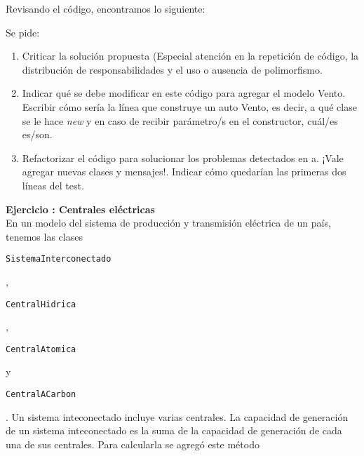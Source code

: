 \documentclass[a4paper,12pt]{article}
\newcounter{ej}
\newcounter{prte}
\newcommand{\ejercicio}[1]{\stepcounter{ej} \setcounter{prte}{0} \par \textbf{ Ejercicio \arabic{ej}: #1} \\ }
\newcommand{\code}[1]{\begin{small}\texttt{#1}\end{small}}
\begin{document}
Revisando el código, encontramos lo siguiente:


Se pide:
\begin{enumerate}
	\item Criticar la solución propuesta (Especial atención en la repetición de código, la distribución de responsabilidades y el uso o ausencia de polimorfismo. 
	\item Indicar qué se debe modificar en este código para agregar el modelo Vento. 			Escribir cómo sería la línea que construye un auto Vento, es decir, a qué clase se le hace \emph{new} y en caso de recibir parámetro/s en el constructor, cuál/es es/son. 
	\item Refactorizar el código para solucionar los problemas detectados en a. ¡Vale agregar nuevas clases y mensajes!. Indicar cómo quedarían las primeras dos líneas del test.

\end{enumerate}
\newpage
\ejercicio{Centrales eléctricas}
En un modelo del sistema de producción y transmisión eléctrica de un país, tenemos las clases \code{SistemaInterconectado}, \code{CentralHidrica}, \code{CentralAtomica} y \code{CentralACarbon}. 
Un sistema inteconectado incluye varias centrales.
La capacidad de generación de un sistema inteconectado es la suma de la capacidad de generación de cada una de sus centrales. Para calcularla se agregó este método


\end{document}
